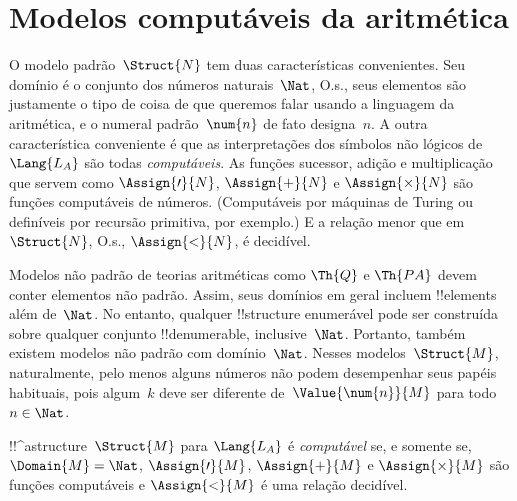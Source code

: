 \documentclass[../../../include/open-logic-section]{subfiles}
\begin{document}
\section{Modelos computáveis da aritmética}

\begin{explain}
O modelo padrão~$\Struct{N}$ tem duas características convenientes.
Seu domínio é o conjunto dos números naturais~$\Nat$, O.s.\@, seus
elementos são justamente o tipo de coisa de que queremos falar usando
a linguagem da aritmética, e o numeral padrão~$\num{n}$ de fato
designa~$n$. A outra característica conveniente é que as interpretações
dos símbolos não lógicos de~$\Lang{L_A}$ são todas \emph{computáveis}.
As funções sucessor, adição e multiplicação que servem como
$\Assign{\prime}{N}$, $\Assign{+}{N}$ e $\Assign{\times}{N}$ são
funções computáveis de números. (Computáveis por máquinas de Turing ou
definíveis por recursão primitiva, por exemplo.) E a relação menor que
em~$\Struct{N}$, O.s.\@, $\Assign{<}{N}$, é decidível.

Modelos não padrão de teorias aritméticas como $\Th{Q}$ e $\Th{PA}$
devem conter elementos não padrão. Assim, seus domínios em geral
incluem !!{element}s além de~$\Nat$. No entanto, qualquer !!{structure}
enumerável pode ser construída sobre qualquer conjunto !!{denumerable},
inclusive~$\Nat$. Portanto, também existem modelos não padrão com
domínio~$\Nat$. Nesses modelos~$\Struct{M}$, naturalmente, pelo menos
alguns números não podem desempenhar seus papéis habituais, pois
algum~$k$ deve ser diferente de~$\Value{\num{n}}{M}$ para todo
$n \in \Nat$.
\end{explain}

\begin{defn}
!!^a{structure}~$\Struct{M}$ para $\Lang{L_A}$ é \emph{computável} se, e somente se,
  $\Domain{M} = \Nat$, $\Assign{\prime}{M}$, $\Assign{+}{M}$ e
  $\Assign{\times}{M}$ são funções computáveis e $\Assign{<}{M}$ é
  uma relação decidível.
\end{defn}
\end{document}
